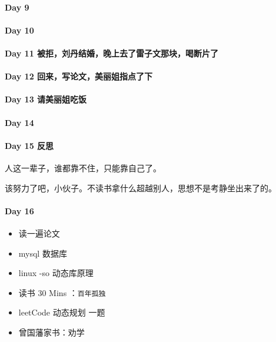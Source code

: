 \documentclass[UTF8,a4paper,8pt]{ctexart}
\begin{document}
 	 \paragraph{Day 9       \quad     }
 	 \paragraph{Day 10      \quad     }
 	 \paragraph{Day 11   被拒，刘丹结婚，晚上去了雷子文那块，喝断片了   \quad     }
 	 
 	 \paragraph{Day 12   回来，写论文，美丽姐指点了下   \quad     }
 	 \paragraph{Day 13   请美丽姐吃饭   \quad     }
 	 \paragraph{Day 14      \quad     }
 	 \paragraph{Day 15   反思   \quad     }
	 	 人这一辈子，谁都靠不住，只能靠自己了。
	 	 
	 	 该努力了吧，小伙子。不读书拿什么超越别人，思想不是考静坐出来了的。
	 	 
 	 \paragraph{Day 16      \quad     }
	 	 \begin{itemize}[itemindent = 1em]
	 	 	\renewcommand\labelitemi{\makebox[0pt][l]{$\square$}\hspace{1em}} 
	 	 	\renewcommand\labelitemi{\makebox[0pt][l]{$\square$}\raisebox{.15ex}{\hspace{0.1em}$\checkmark$}}	
	 	 	\item   读一遍论文	
	 	 	\item 	mysql 数据库
	 	 	\item   linux -so 动态库原理
	 	 	
	 	 	\item   读书  30 Mins	：\verb|百年孤独|
	 	 	\item   leetCode 动态规划 一题
	 	 	
	 	 	\renewcommand\labelitemi{\makebox[0pt][l]{$\square$}\hspace{1em}}
	 	 	\item  曾国藩家书：劝学
	 	 \end{itemize}
\end{document}
